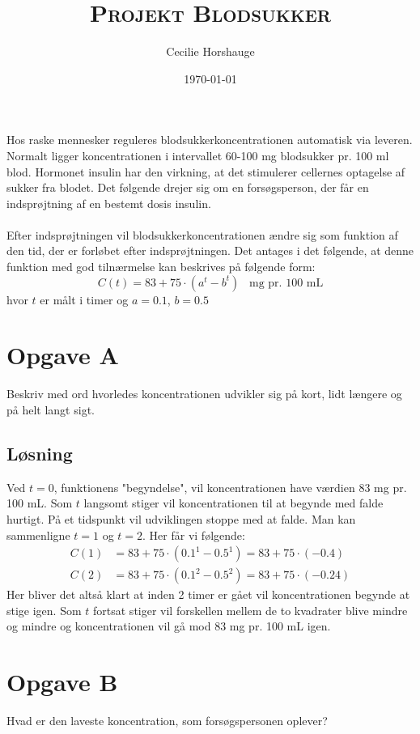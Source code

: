 \documentclass[a4paper, 11pt]{article}
\title{{\large \textsc{Projekt Blodsukker}}}
\author{Cecilie Horshauge}
\date{\today}
\begin{document}
\maketitle
\noindent Hos raske mennesker reguleres blodsukkerkoncentrationen automatisk via leveren. 
Normalt ligger koncentrationen i intervallet 60-100 mg blodsukker pr. 100 ml blod. 
Hormonet insulin har den virkning, at det stimulerer cellernes optagelse af sukker fra blodet. 
Det følgende drejer sig om en forsøgsperson, der får en indsprøjtning af en bestemt dosis insulin.\\\\
Efter indsprøjtningen vil blodsukkerkoncentrationen ændre sig som funktion af den tid,
der er forløbet efter indsprøjtningen. Det antages i det følgende, at denne funktion med god tilnærmelse kan beskrives på følgende form: 
\[C(t)=83+75\cdot (a^t-b^t) \;\;\; \text{mg pr. 100 mL}\]
hvor \(t\) er målt i timer og \(a=0.1\), \(b=0.5\)

\section*{Opgave A} 
Beskriv med ord hvorledes koncentrationen udvikler sig på kort, lidt længere og på helt langt sigt.

\subsection*{Løsning}
Ved \(t=0\), funktionens "begyndelse", vil koncentrationen have værdien \(83\) mg pr. 100 mL. Som \(t\) langsomt stiger vil koncentrationen til at begynde med falde hurtigt. På et tidspunkt vil udviklingen stoppe med at falde. Man kan sammenligne \(t=1\) og \(t=2\). Her får vi følgende:
\begin{align*}
    C(1)&=83+75 \cdot (0.1^1-0.5^1)=83+75 \cdot (-0.4)\\
    C(2)&=83+75 \cdot (0.1^2-0.5^2)=83+75 \cdot (-0.24)
\end{align*} 
Her bliver det altså klart at inden 2 timer er gået vil koncentrationen begynde at stige igen. Som \(t\) fortsat stiger vil forskellen mellem de to kvadrater blive mindre og mindre og koncentrationen vil gå mod 83 mg pr. 100 mL igen.
\clearpage
\section*{Opgave B} 
Hvad er den laveste koncentration, som forsøgspersonen oplever?
\end{document}
